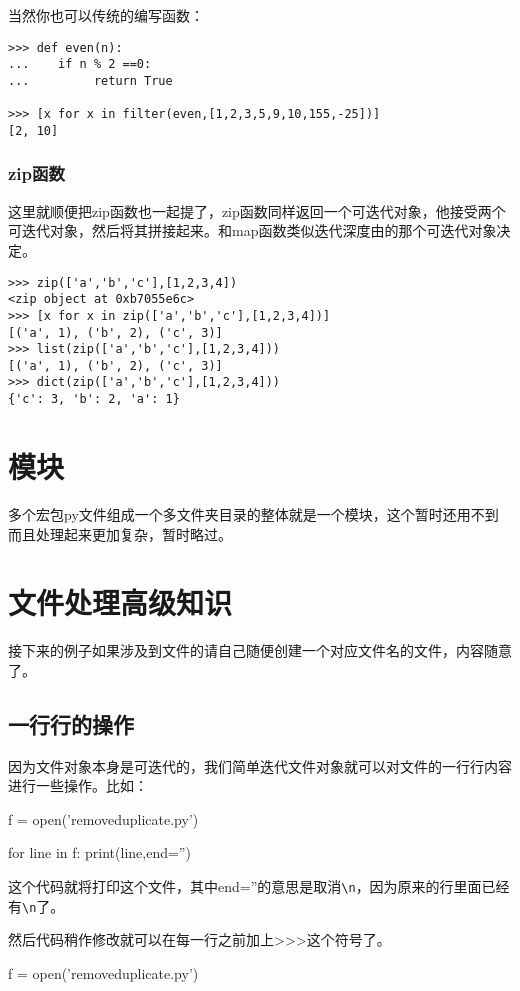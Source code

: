 \documentclass[12pt,oneside]{book}
\begin{document}
\begin{common-format}
当然你也可以传统的编写函数：
\begin{Verbatim}
>>> def even(n):
...    if n % 2 ==0:
...         return True

>>> [x for x in filter(even,[1,2,3,5,9,10,155,-25])]
[2, 10]
\end{Verbatim}

\subsection{zip函数}
这里就顺便把zip函数也一起提了，zip函数同样返回一个可迭代对象，他接受两个可迭代对象，然后将其拼接起来。和map函数类似迭代深度由的那个可迭代对象决定。
\begin{Verbatim}
>>> zip(['a','b','c'],[1,2,3,4])
<zip object at 0xb7055e6c>
>>> [x for x in zip(['a','b','c'],[1,2,3,4])]
[('a', 1), ('b', 2), ('c', 3)]
>>> list(zip(['a','b','c'],[1,2,3,4]))
[('a', 1), ('b', 2), ('c', 3)]
>>> dict(zip(['a','b','c'],[1,2,3,4]))
{'c': 3, 'b': 2, 'a': 1}
\end{Verbatim}





\chapter{模块}
多个宏包py文件组成一个多文件夹目录的整体就是一个模块，这个暂时还用不到而且处理起来更加复杂，暂时略过。


\chapter{文件处理高级知识}
接下来的例子如果涉及到文件的请自己随便创建一个对应文件名的文件，内容随意了。


\section{一行行的操作}
因为文件对象本身是可迭代的，我们简单迭代文件对象就可以对文件的一行行内容进行一些操作。比如：
\begin{tcbpython}
f = open('removeduplicate.py')

for line in f:
    print(line,end='')
\end{tcbpython}
这个代码就将打印这个文件，其中end=''的意思是取消\verb+\n+，因为原来的行里面已经有\verb+\n+了。

然后代码稍作修改就可以在每一行之前加上>>>这个符号了。 
\begin{tcbpython}
f = open('removeduplicate.py')


\end{tcbpython}
\end{common-format}
\end{document}
